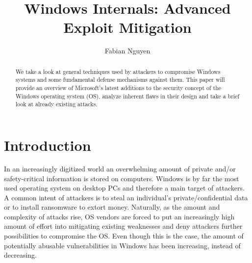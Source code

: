 \documentclass[10pt,twocolumn,a4paper]{article}
\author{Fabian Nguyen}
\begin{document}
\title{Windows Internals: Advanced Exploit Mitigation}

\maketitle


\begin{abstract}
We take a look at general techniques used by attackers to compromise Windows systems and some fundamental defense mechanisms against them.
This paper will provide an overview of Microsoft's latest additions to the security concept of the Windows operating system (OS), analyze inherent flaws in their design and take a brief look at already existing attacks. 
\end{abstract}

\section{Introduction}\label{sec:introduction}
In an increasingly digitized world an overwhelming amount of private and/or safety-critical information is stored on computers.
Windows is by far the most used operating system on desktop PCs \cite{OSshare} and therefore a main target of attackers.
A common intent of attackers is to steal an individual's private/confidential data or to install ransomware to extort money.
Naturally, as the amount and complexity of attacks rise, OS vendors are forced to put an increasingly high amount of effort into mitigating existing weaknesses and deny attackers further possibilities to compromise the OS.
Even though this is the case, the amount of potentially abusable vulnerabilities in Windows has been increasing, instead of decreasing.
\end{document}
